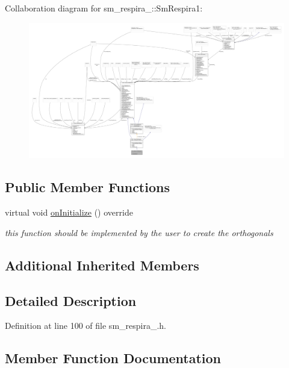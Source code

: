 Collaboration diagram for sm\+\_\+respira\+\_\+:\+:Sm\+Respira1\+:
\nopagebreak
\begin{figure}[H]
\begin{center}
\leavevmode
\includegraphics[width=350pt]{structsm__respira__1_1_1SmRespira1__coll__graph}
\end{center}
\end{figure}
\subsection*{Public Member Functions}
\begin{DoxyCompactItemize}
\item 
virtual void \hyperlink{structsm__respira__1_1_1SmRespira1_a6be26eb018ef73a2e39772fe4a03e551}{on\+Initialize} () override
\begin{DoxyCompactList}\small\item\em this function should be implemented by the user to create the orthogonals \end{DoxyCompactList}\end{DoxyCompactItemize}
\subsection*{Additional Inherited Members}


\subsection{Detailed Description}


Definition at line 100 of file sm\+\_\+respira\+\_.\+h.



\subsection{Member Function Documentation}
\mbox{\label{structsm__respira__1_1_1SmRespira1_a6be26eb018ef73a2e39772fe4a03e551}} 

